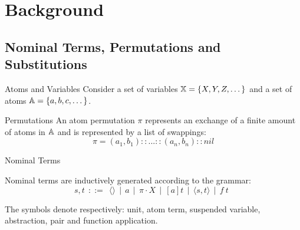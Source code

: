 \section{Background}
\subsection{Nominal Terms, Permutations and Substitutions}
\begin{frame}{Atoms and Variables} 
    Consider a set of variables $\mathbb{X} = \{X, Y, Z, \dots \}$ and 
    a set of atoms $\mathbb{A} = \{a, b, c, \dots \}$.
\end{frame}

\begin{frame}{Permutations}
    An atom permutation $\pi$ represents an exchange of a finite amount of atoms in
    $\mathbb{A}$
    and is represented by a list of swappings: 
\begin{equation*}
    \pi = (a_1, b_1):: ... ::(a_n, b_n)::nil 
\end{equation*}
\end{frame}

\begin{frame}{Nominal Terms}
    \begin{definition}
    Nominal terms are inductively generated according to the grammar: 
    \begin{equation*}
        s,t \ \ ::= \ \ \langle \rangle \ \ | \ \ a \ \ | \ \ \pi \cdot X \ \ | \ \ [a]t \ \ |
                    \ \ \langle s, t \rangle \ \       | \ \ f \ t \ \   
    \end{equation*}
    \end{definition}
    The symbols denote respectively: unit, atom term, suspended variable,
    abstraction, pair and function application.
\end{frame}


